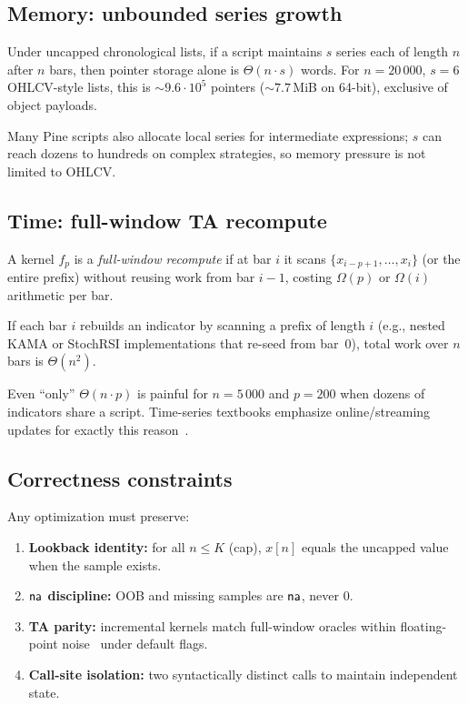 \documentclass[11pt,a4paper]{article}
\begin{document}
\subsection{Memory: unbounded series growth}

\begin{proposition}
\label{prop:mem-linear}
Under uncapped chronological lists, if a script maintains $s$ series each of
length $n$ after $n$ bars, then pointer storage alone is
$\Theta(n\cdot s)$ words.  For $n=20\,000$, $s=6$ OHLCV-style lists, this is
$\sim 9.6\cdot 10^5$ pointers ($\sim 7.7$\,MiB on 64-bit), exclusive of object
payloads.
\end{proposition}

Many Pine scripts also allocate local series for intermediate expressions;
$s$ can reach dozens to hundreds on complex strategies, so memory pressure is
not limited to OHLCV.

\subsection{Time: full-window TA recompute}

\begin{definition}
A kernel $f_p$ is a \emph{full-window recompute} if at bar $i$ it scans
$\{x_{i-p+1},\ldots,x_i\}$ (or the entire prefix) without reusing work from
bar $i-1$, costing $\Omega(p)$ or $\Omega(i)$ arithmetic per bar.
\end{definition}

\begin{proposition}
\label{prop:quad}
If each bar $i$ rebuilds an indicator by scanning a prefix of length $i$
(e.g., nested KAMA or StochRSI implementations that re-seed from bar~$0$),
total work over $n$ bars is $\Theta(n^2)$.
\end{proposition}

Even ``only'' $\Theta(n\cdot p)$ is painful for $n=5\,000$ and $p=200$ when
dozens of indicators share a script.  Time-series textbooks emphasize
online/streaming updates for exactly this reason~\citep{box1970time,tsay2010analysis}.

\subsection{Correctness constraints}

Any optimization must preserve:
\begin{enumerate}[leftmargin=*]
  \item \textbf{Lookback identity:} for all $n\le K$ (cap), $x[n]$ equals the
        uncapped value when the sample exists.
  \item \textbf{$\textsf{na}$ discipline:} OOB and missing samples are $\textsf{na}$, never $0$.
  \item \textbf{TA parity:} incremental kernels match full-window oracles within
        floating-point noise~\citep{higham2002accuracy,ieee754} under default
        flags.
  \item \textbf{Call-site isolation:} two syntactically distinct calls to
         maintain independent state.
\end{enumerate}
\end{document}
